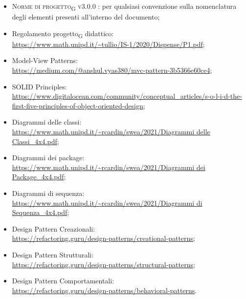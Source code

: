 \begin{itemize}
	\item \textsc{Norme di progetto\textsubscript{G} v3.0.0 }: per qualsiasi convenzione sulla nomenclatura degli elementi presenti all’interno del documento;
	
	\item Regolamento progetto\textsubscript{G} didattico: \\ {\url{https://www.math.unipd.it/~tullio/IS-1/2020/Dispense/P1.pdf}};
	\item Model-View Patterns: \\ {\url{https://medium.com/@anshul.vyas380/mvc-pattern-3b5366e60ce4}};
	\item SOLID Principles: \\ {\url{https://www.digitalocean.com/community/conceptual_articles/s-o-l-i-d-the-first-five-principles-of-object-oriented-design}};
	\item Diagrammi delle classi: \\ {\url{https://www.math.unipd.it/~rcardin/swea/2021/Diagrammi delle Classi_4x4.pdf}};
	\item Diagrammi dei package: \\ {\url{https://www.math.unipd.it/~rcardin/swea/2021/Diagrammi dei Package_4x4.pdf}};
	\item Diagrammi di sequenza: \\ {\url{https://www.math.unipd.it/~rcardin/swea/2021/Diagrammi di Sequenza_4x4.pdf}};
	\item Design Pattern Creazionali: \\ {\url{https://refactoring.guru/design-patterns/creational-patterns}};
	\item Design Pattern Strutturali: \\ {\url{https://refactoring.guru/design-patterns/structural-patterns}};
	\item Design Pattern Comportamentali: \\ {\url{https://refactoring.guru/design-patterns/behavioral-patterns}}.
\end{itemize}



